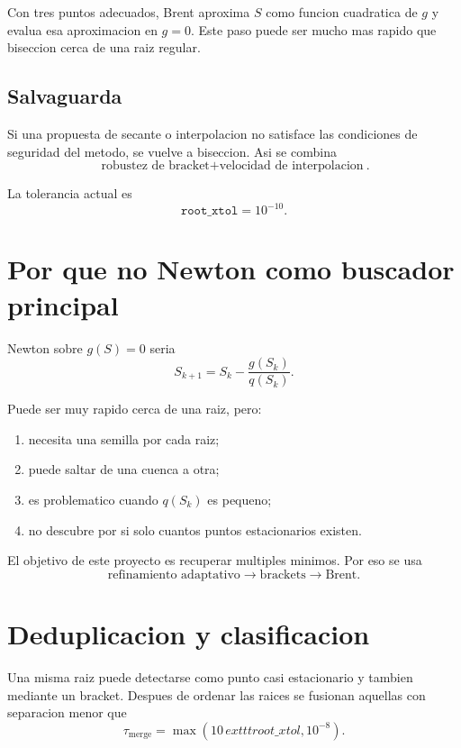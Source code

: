 \documentclass[11pt]{article}
\begin{document}
Con tres puntos adecuados, Brent aproxima \(S\) como funcion cuadratica de
\(g\) y evalua esa aproximacion en \(g=0\). Este paso puede ser mucho mas
rapido que biseccion cerca de una raiz regular.

\subsection{Salvaguarda}

Si una propuesta de secante o interpolacion no satisface las condiciones de
seguridad del metodo, se vuelve a biseccion. Asi se combina
\[
\boxed{
\text{robustez de bracket}
+
\text{velocidad de interpolacion}
}.
\]

La tolerancia actual es
\[
\texttt{root\_xtol}=10^{-10}.
\]

\section{Por que no Newton como buscador principal}

Newton sobre \(g(S)=0\) seria
\begin{equation}
S_{k+1}
=
S_k
-
\frac{g(S_k)}{q(S_k)}.
\label{eq:newton}
\end{equation}

Puede ser muy rapido cerca de una raiz, pero:

\begin{enumerate}[leftmargin=2.4em]
    \item necesita una semilla por cada raiz;
    \item puede saltar de una cuenca a otra;
    \item es problematico cuando \(q(S_k)\) es pequeno;
    \item no descubre por si solo cuantos puntos estacionarios existen.
\end{enumerate}

El objetivo de este proyecto es recuperar multiples minimos. Por eso se usa
\[
\text{refinamiento adaptativo}
\to
\text{brackets}
\to
\text{Brent}.
\]

\section{Deduplicacion y clasificacion}

Una misma raiz puede detectarse como punto casi estacionario y tambien mediante
un bracket. Despues de ordenar las raices se fusionan aquellas con separacion
menor que
\begin{equation}
\tau_{\mathrm{merge}}
=
\max(
10\,	exttt{root\_xtol},
10^{-8}
).
\label{eq:merge}
\end{equation}
\end{document}
